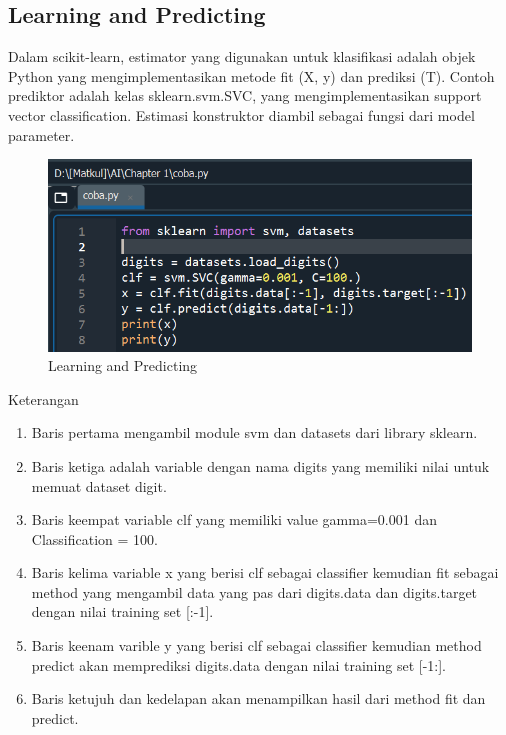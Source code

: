 \subsection{Learning and Predicting}

\par Dalam scikit-learn, estimator yang digunakan untuk klasifikasi adalah objek Python yang mengimplementasikan metode fit (X, y) dan prediksi (T). Contoh prediktor adalah kelas sklearn.svm.SVC, yang mengimplementasikan support vector classification. Estimasi konstruktor diambil sebagai fungsi dari model parameter.

    \begin{figure}[H]
    \centering
    \includegraphics[width=13cm]{figures/chapter1/12.PNG}
    \caption{Learning and Predicting}
    \end{figure}

\par Keterangan

    \begin{enumerate}
        \item Baris pertama mengambil module svm dan datasets dari library sklearn.
        \item Baris ketiga adalah variable dengan nama digits yang memiliki nilai untuk memuat dataset digit.
        \item Baris keempat variable clf yang memiliki value gamma=0.001 dan Classification = 100.
        \item Baris kelima variable x yang berisi clf sebagai classifier kemudian fit sebagai method yang mengambil data yang pas dari digits.data dan digits.target dengan nilai training set [:-1].
        \item Baris keenam varible y yang berisi clf sebagai classifier kemudian method predict akan memprediksi digits.data dengan nilai training set [-1:].
        \item Baris ketujuh dan kedelapan akan menampilkan hasil dari method fit dan predict.
    \end{enumerate}

